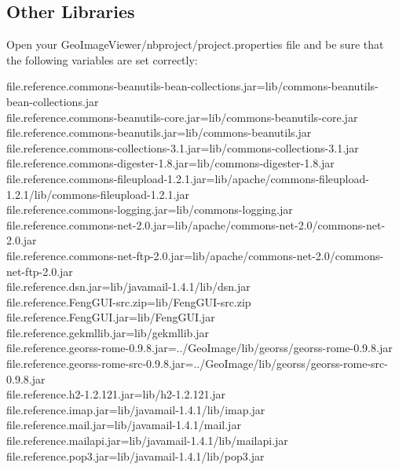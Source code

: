 \documentclass[12pt,a4paper,final,makeidx]{report}
\begin{document}
\subsection{Other Libraries}
Open your GeoImageViewer/nbproject/project.properties file and be sure that the following variables are set correctly:\\
\begin{tiny}
file.reference.commons-beanutils-bean-collections.jar=lib/commons-beanutils-bean-collections.jar\\
file.reference.commons-beanutils-core.jar=lib/commons-beanutils-core.jar\\
file.reference.commons-beanutils.jar=lib/commons-beanutils.jar\\
file.reference.commons-collections-3.1.jar=lib/commons-collections-3.1.jar\\
file.reference.commons-digester-1.8.jar=lib/commons-digester-1.8.jar\\
file.reference.commons-fileupload-1.2.1.jar=lib/apache/commons-fileupload-1.2.1/lib/commons-fileupload-1.2.1.jar\\
file.reference.commons-logging.jar=lib/commons-logging.jar\\
file.reference.commons-net-2.0.jar=lib/apache/commons-net-2.0/commons-net-2.0.jar\\
file.reference.commons-net-ftp-2.0.jar=lib/apache/commons-net-2.0/commons-net-ftp-2.0.jar\\
file.reference.dsn.jar=lib/javamail-1.4.1/lib/dsn.jar\\
file.reference.FengGUI-src.zip=lib/FengGUI-src.zip\\
file.reference.FengGUI.jar=lib/FengGUI.jar\\
file.reference.gekmllib.jar=lib/gekmllib.jar\\
file.reference.georss-rome-0.9.8.jar=../GeoImage/lib/georss/georss-rome-0.9.8.jar\\
file.reference.georss-rome-src-0.9.8.jar=../GeoImage/lib/georss/georss-rome-src-0.9.8.jar\\
file.reference.h2-1.2.121.jar=lib/h2-1.2.121.jar\\
file.reference.imap.jar=lib/javamail-1.4.1/lib/imap.jar\\
file.reference.mail.jar=lib/javamail-1.4.1/mail.jar\\
file.reference.mailapi.jar=lib/javamail-1.4.1/lib/mailapi.jar\\
file.reference.pop3.jar=lib/javamail-1.4.1/lib/pop3.jar\\

\end{tiny}
\end{document}
